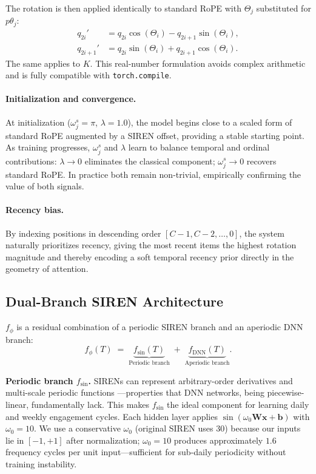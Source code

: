 \documentclass{article}
\begin{document}
The rotation is then applied identically to standard RoPE with $\Theta_j$
substituted for $p\theta_j$:
\begin{align}
  q_{2i}' &= q_{2i} \cos(\Theta_i) - q_{2i+1} \sin(\Theta_i),
  \label{eq:rot_cos}\\
  q_{2i+1}' &= q_{2i} \sin(\Theta_i) + q_{2i+1} \cos(\Theta_i).
  \label{eq:rot_sin}
\end{align}
The same applies to $K$. This real-number formulation avoids complex
arithmetic and is fully compatible with \texttt{torch.compile}.

\paragraph{Initialization and convergence.} At initialization
($\omega^s_j = \pi$, $\lambda = 1.0$), the model begins close to a scaled
form of standard RoPE augmented by a SIREN offset, providing a stable
starting point. As training progresses, $\omega^s_j$ and $\lambda$ learn to
balance temporal and ordinal contributions: $\lambda \to 0$ eliminates the
classical component; $\omega^s_j \to 0$ recovers standard RoPE. In practice
both remain non-trivial, empirically confirming the value of both signals.

\paragraph{Recency bias.} By indexing positions in descending order
$[C-1, C-2, \dots, 0]$, the system naturally prioritizes recency, giving
the most recent items the highest rotation magnitude and thereby encoding a
soft temporal recency prior directly in the geometry of attention.

\subsection{Dual-Branch SIREN Architecture}
\label{sec:siren_arch}

$f_\phi$ is a residual combination of a periodic SIREN branch and an
aperiodic DNN branch:
\begin{equation}
  f_\phi(T) \;=\;
    \underbrace{f_{\mathrm{sin}}(T)}_{\text{Periodic branch}}
    \;+\;
    \underbrace{f_{\mathrm{DNN}}(T)}_{\text{Aperiodic branch}}.
  \label{eq:dual_branch}
\end{equation}

\textbf{Periodic branch $f_{\mathrm{sin}}$.}
SIRENs can represent arbitrary-order derivatives and multi-scale periodic
functions \citep{sitzmann2020siren}---properties that DNN networks, being
piecewise-linear, fundamentally lack. This makes $f_{\mathrm{sin}}$ the ideal
component for learning daily and weekly engagement cycles. Each hidden layer
applies $\sin(\omega_0 \mathbf{W} \mathbf{x} + \mathbf{b})$ with $\omega_0 = 10$.
We use a conservative $\omega_0$ (original SIREN uses 30) because our inputs
lie in $[-1, +1]$ after normalization; $\omega_0 = 10$ produces approximately
$1.6$ frequency cycles per unit input---sufficient for sub-daily periodicity
without training instability.
\end{document}

